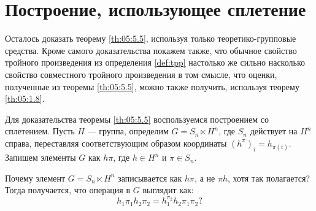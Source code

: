 \section{Построение, использующее сплетение}\label{wreath_construction}

Осталось доказать теорему \ref{th:05:5.5}, используя только теоретико-групповые средства. Кроме самого доказательства покажем также, что обычное свойство тройного произведения из определения \ref{def:tpp} настолько же сильно насколько свойство совместного тройного произведения в том смысле, что оценки, полученные из теоремы \ref{th:05:5.5}, можно также получить, используя теорему \ref{th:05:1.8}.

Для доказательства теоремы \ref{th:05:5.5} воспользуемся построением со сплетением. Пусть $H$ --- группа, определим $G = S_n \ltimes H^n$, где $S_n$ действует на $H^n$ справа, переставляя соответствующим образом координаты $(h^\pi)_i = h_{\pi(i)}$. Запишем элементы $G$ как $h \pi$, где $h \in H^n$ и $\pi \in S_n$.
\begin{question}
  Почему элемент $G = S_n \ltimes H^n$ записывается как $h \pi$, а не $\pi h$, хотя так полагается? Тогда получается, что операция в $G$ выглядит как:
  \[
  	h_1 \pi_1 h_2 \pi_2 = h_1^{\pi_2} h_2 \pi_1 \pi_2?
  \]
\end{question}

